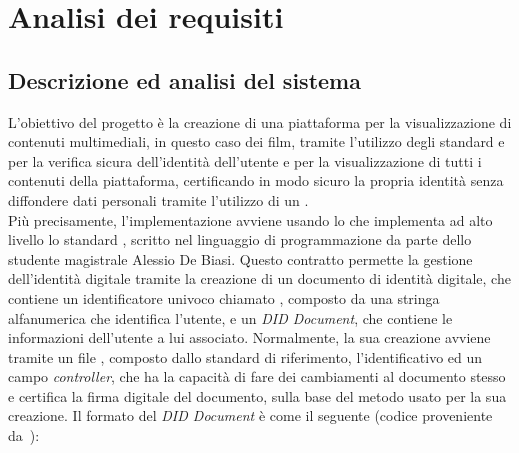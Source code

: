 
\chapter{Analisi dei requisiti}\label{cap:analisi-requisiti}


\section{Descrizione ed analisi del sistema}\label{sec:analisi-sistema}
L'obiettivo del progetto è la creazione di una piattaforma per la visualizzazione di contenuti multimediali, in questo caso dei film,
tramite l'utilizzo degli standard   e  per la verifica sicura dell'identità dell'utente e per la 
visualizzazione di tutti i contenuti della piattaforma, certificando in modo sicuro la propria identità senza diffondere dati personali tramite 
l'utilizzo di un .\\

Più precisamente, l'implementazione avviene usando lo  che implementa ad alto livello lo standard , 
scritto nel linguaggio di programmazione  da parte dello studente magistrale Alessio De Biasi.
Questo contratto permette la gestione dell'identità digitale tramite la creazione di un documento di identità digitale, che contiene un identificatore univoco
chiamato , composto da una stringa alfanumerica che identifica l'utente, e un \textit{DID Document}, che contiene le informazioni dell'utente a lui associato.
Normalmente, la sua creazione avviene tramite un file , composto dallo standard di riferimento, l'identificativo ed un campo \textit{controller},
che ha la capacità di fare dei cambiamenti al documento stesso e certifica la firma digitale del documento, sulla base del metodo usato per la sua creazione.
Il formato del \textit{DID Document} è come il seguente (codice proveniente da~\cite{site:didw3c}):

